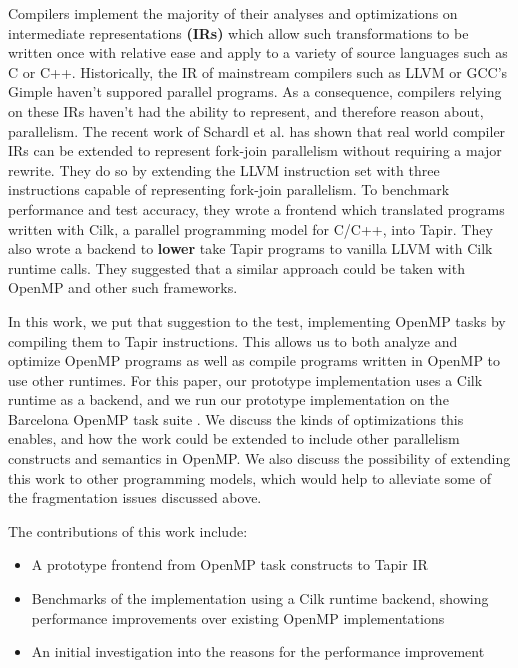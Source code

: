 \documentclass[sigconf]{acmart}
\begin{document}
Compilers implement the majority of their analyses and optimizations on
intermediate representations \textbf{(IRs)} which allow such transformations
to be written once with relative ease and apply to a variety of source languages
such as C or C++.
Historically, the IR of mainstream compilers such as LLVM\cite{llvm} or GCC's Gimple\cite{}
haven't suppored parallel programs. As a consequence, compilers relying on these
IRs haven't had the ability to
represent, and therefore reason about, parallelism. The recent work of
Schardl et al. \cite{tapir} has shown that real world compiler IRs can be
extended to represent fork-join parallelism without requiring a major rewrite.
They do so by extending the LLVM instruction set with three instructions
capable of representing fork-join parallelism. To benchmark performance and test
accuracy, they wrote a frontend which translated programs written with Cilk, a parallel
programming model for C/C++, into Tapir. They also wrote a backend to \textbf{lower}
take Tapir programs to vanilla LLVM with Cilk runtime calls.
They suggested that a similar approach could be taken with OpenMP and other
such frameworks.

In this work, we put that suggestion to the test, implementing OpenMP tasks by
compiling them to Tapir instructions. This allows us to both analyze and optimize
OpenMP programs as well as compile programs written in OpenMP to use other runtimes.
For this paper, our prototype implementation uses a Cilk runtime as a backend,
and we run our prototype implementation on the Barcelona OpenMP task suite
\cite{barcelona}. We discuss the kinds of optimizations this enables, and how
the work could be extended to include other parallelism constructs and semantics
in OpenMP. We also discuss the possibility of extending this work to other
programming models, which would help to alleviate some of the fragmentation
issues discussed above. 

The contributions of this work include: 

\begin{itemize}
\item A prototype frontend from OpenMP task constructs to Tapir IR
\item Benchmarks of the implementation using a Cilk runtime backend, showing
performance improvements over existing OpenMP implementations
\item An initial investigation into the reasons for the performance improvement
\end{itemize}
\end{document}
